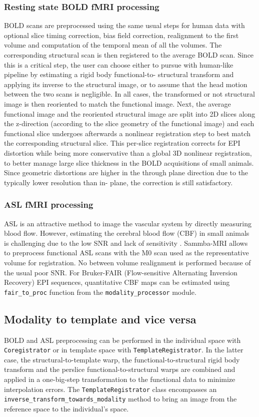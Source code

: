 \documentclass[utf8, a4paper, final, crop]{frontiersSCNS}
\newcommand{\pythoninline}[1]{\texttt{#1}}
\begin{document}
\subsubsection{Resting state BOLD fMRI processing}
BOLD scans are preprocessed using the same usual steps for human data
with optional slice timing correction, bias field correction, realignment to the 
first volume
and computation of the temporal mean of all the volumes.
The corresponding structural scan is then registered to the average BOLD scan.
Since this is a critical step, the user can choose
either to pursue with human-like pipeline by estimating a rigid body functional-to-
structural transform and applying its inverse to the structural image, or to assume 
that the head motion between the two scans is negligible.
In all cases, the transformed or not structural image is then reoriented
to match the functional image. Next, the average functional image and the reoriented 
structural image are split into 2D slices along the z-direction (according to the 
slice geometry of the functional image) and each functional slice undergoes 
afterwards a nonlinear registration step to best match the corresponding structural 
slice. This per-slice registration corrects for EPI distortion while being more 
conservative than a global 3D nonlinear registration, to better manage large slice 
thickness in the BOLD acquisitions of small animals. Since geometric distortions are 
higher in the through plane direction due to the typically lower resolution than in-
plane, the correction is still satisfactory.

\subsubsection{ASL fMRI processing}
ASL is an attractive method 
to image the vascular system by directly measuring blood flow.
However, estimating the cerebral blood flow (CBF) in small animals is challenging due 
to the low SNR and lack of sensitivity \citep{kober2008experimental}.
Sammba-MRI allows to preprocess functional ASL scans with the M0 scan used 
as the representative volume for registration. 
No between volume realignment is performed because of the usual poor SNR.
For Bruker-FAIR (Flow-sensitive Alternating Inversion Recovery) EPI sequences,
quantitative   CBF   maps can be estimated using \pythoninline{fair_to_proc} 
function from the \pythoninline{modality_processor} module.

\subsection{Modality to template and vice versa}
BOLD and ASL preprocessing can be performed in the individual space with
\pythoninline{Coregistrator} or in template space with \pythoninline{TemplateRegistrator}.
In the latter case, the structural-to-template warp, the functional-to-structural 
rigid body transform and the perslice functional-to-structural warps are  
combined 
 and applied in a one-big-step transformation
to the functional data to minimize interpolation errors.
The \pythoninline{TemplateRegistrator} class encompasses an
\pythoninline{inverse_transform_towards_modality}
method to bring an image from the reference space to the individual's space.
\end{document}

